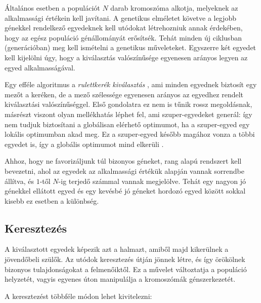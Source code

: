 Általános esetben a populációt $N$ darab kromoszóma alkotja, melyeknek az alkalmassági értékein kell javítani. A genetikus elméletet követve a legjobb génekkel rendelkező egyedeknek kell utódokat létrehozniuk annak érdekében, hogy az egész populáció génállományát erősítsék. Tehát minden új ciklusban (generációban) meg kell ismételni a genetikus műveleteket. Egyszerre két egyedet kell kijelölni úgy, hogy a kiválasztás valószínűsége egyenesen arányos legyen az egyed alkalmasságával.

Egy efféle algoritmus a \textit{rulettkerék kiválasztás} , ami minden egyednek biztosít egy mezőt a keréken, de a mező szélessége egyenesen arányos az egyedhez rendelt kiválasztási valószínűséggel. Első gondolatra ez nem is tűnik rossz megoldásnak, másrészt viszont olyan mellékhatás léphet fel, ami szuper-egyedeket generál: így nem tudjuk biztosítani a globálisan elérhető optimumot, ha a szuper-egyed egy lokális optimumban akad meg. Ez a szuper-egyed később magához vonza a többi egyedet is, így a globális optimumot mind elkerüli \parencite{kanovic2017}.

Ahhoz, hogy ne favorizáljunk túl bizonyos géneket, rang alapú rendszert kell bevezetni, ahol az egyedek az alkalmassági értékük alapján vannak sorrendbe állítva, és $1$-től $N$-ig terjedő számmal vannak megjelölve. Tehát egy nagyon jó génekkel ellátott egyed és egy kevésbé jó géneket hordozó egyed között sokkal kisebb ez esetben a különbség.

\subsection{Keresztezés}

A kiválasztott egyedek képezik azt a halmazt, amiből majd kikerülnek a jövendőbeli szülők. Az utódok keresztezés útján jönnek létre, és így örökölnek bizonyos tulajdonságokat a felmenőiktől. Ez a művelet változtatja a populáció helyzetét, vagyis egyenes úton manipulálja a kromoszómák génszerkezetét.

A keresztezést többféle módon lehet kivitelezni:

